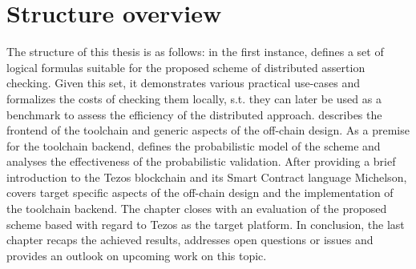 \section{Structure overview}
The structure of this thesis is as follows: in the first instance,  defines a set of logical formulas suitable for the proposed scheme of distributed assertion checking. Given this set, it demonstrates various practical use-cases  and formalizes the costs of checking them locally, s.t. they can later be used as a benchmark to assess the efficiency of the distributed approach.  describes the frontend of the toolchain and generic aspects of the off-chain design. As a premise for the toolchain backend,  defines the probabilistic model of the scheme and analyses the effectiveness of the probabilistic validation. After providing a brief introduction to the Tezos blockchain and its Smart Contract language Michelson,  covers target specific aspects of the off-chain design and the implementation of the toolchain backend. The chapter closes with an evaluation of the proposed scheme based with regard to Tezos as the target platform. In conclusion, the last chapter recaps the achieved results, addresses open questions or issues and provides an outlook on upcoming work on this topic.